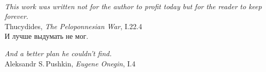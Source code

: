\documentclass[10 pt]{article}
\begin{document}
  \\

\emph{This work was written not for the author to profit today but for the reader to keep forever.}\\

\hfill Thucydides, \emph{The Peloponnesian War}, I.22.4\\

И лучше выдумать не мог. \\

\emph{And a better plan he couldn't find.}\\

\hfill Aleksandr S.\,Pushkin, \emph{Eugene Onegin}, I.4
\end{document}
